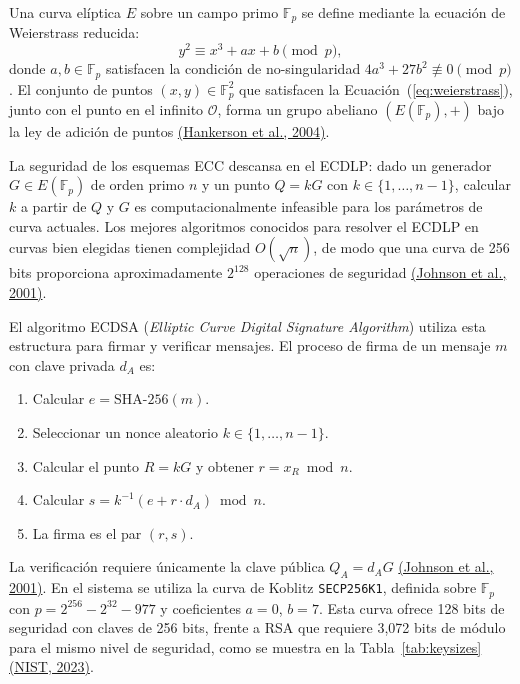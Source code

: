\documentclass[10pt,letterpaper]{report}
\newcommand{\citeref}[2]{\hyperlink{ref:#1}{(#2)}}
\begin{document}
Una curva elíptica $E$ sobre un campo primo $\mathbb{F}_p$ se define mediante la ecuación de Weierstrass reducida:
\begin{equation}
    y^2 \equiv x^3 + ax + b \pmod{p},
    \label{eq:weierstrass}
\end{equation}
donde $a, b \in \mathbb{F}_p$ satisfacen la condición de no-singularidad $4a^3 + 27b^2 \not\equiv 0 \pmod{p}$. El conjunto de puntos $(x, y) \in \mathbb{F}_p^2$ que satisfacen la Ecuación~(\ref{eq:weierstrass}), junto con el punto en el infinito $\mathcal{O}$, forma un grupo abeliano $(E(\mathbb{F}_p), +)$ bajo la ley de adición de puntos \citeref{hankerson2004}{Hankerson et al., 2004}.

La seguridad de los esquemas ECC descansa en el ECDLP: dado un generador $G \in E(\mathbb{F}_p)$ de orden primo $n$ y un punto $Q = kG$ con $k \in \{1, \ldots, n{-}1\}$, calcular $k$ a partir de $Q$ y $G$ es computacionalmente infeasible para los parámetros de curva actuales. Los mejores algoritmos conocidos para resolver el ECDLP en curvas bien elegidas tienen complejidad $O(\sqrt{n})$, de modo que una curva de 256 bits proporciona aproximadamente $2^{128}$ operaciones de seguridad \citeref{johnson2001}{Johnson et al., 2001}.

El algoritmo ECDSA (\textit{Elliptic Curve Digital Signature Algorithm}) utiliza esta estructura para firmar y verificar mensajes. El proceso de firma de un mensaje $m$ con clave privada $d_A$ es:
\begin{enumerate}[leftmargin=*]
    \item Calcular $e = \text{SHA-256}(m)$.
    \item Seleccionar un nonce aleatorio $k \in \{1, \ldots, n{-}1\}$.
    \item Calcular el punto $R = kG$ y obtener $r = x_R \bmod n$.
    \item Calcular $s = k^{-1}(e + r \cdot d_A) \bmod n$.
    \item La firma es el par $(r, s)$.
\end{enumerate}
La verificación requiere únicamente la clave pública $Q_A = d_A G$ \citeref{johnson2001}{Johnson et al., 2001}. En el sistema se utiliza la curva de Koblitz \texttt{SECP256K1}, definida sobre $\mathbb{F}_p$ con $p = 2^{256} - 2^{32} - 977$ y coeficientes $a = 0$, $b = 7$. Esta curva ofrece 128 bits de seguridad con claves de 256 bits, frente a RSA que requiere 3{,}072 bits de módulo para el mismo nivel de seguridad, como se muestra en la Tabla~\ref{tab:keysizes} \citeref{nist2023}{NIST, 2023}.
\end{document}

